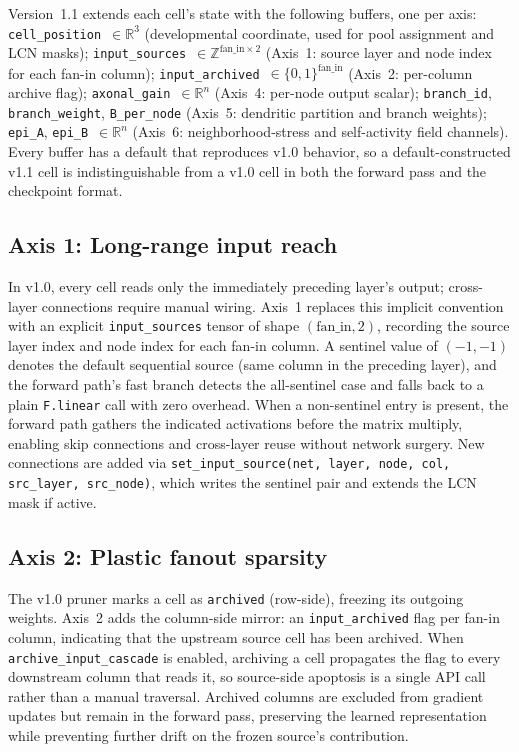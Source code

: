 \documentclass[11pt]{article}
\newcommand{\R}{\mathbb{R}}
\begin{document}
Version~1.1 extends each cell's state with the following buffers, one
per axis:
\texttt{cell\_position}~$\in \R^3$ (developmental coordinate, used for
  pool assignment and LCN masks);
\texttt{input\_sources}~$\in \mathbb{Z}^{\mathrm{fan\_in} \times 2}$
  (Axis~1: source layer and node index for each fan-in column);
\texttt{input\_archived}~$\in \{0,1\}^{\mathrm{fan\_in}}$
  (Axis~2: per-column archive flag);
\texttt{axonal\_gain}~$\in \R^{n}$ (Axis~4: per-node output scalar);
\texttt{branch\_id}, \texttt{branch\_weight}, \texttt{B\_per\_node}
  (Axis~5: dendritic partition and branch weights);
\texttt{epi\_A}, \texttt{epi\_B}~$\in \R^{n}$
  (Axis~6: neighborhood-stress and self-activity field channels).
Every buffer has a default that reproduces v1.0 behavior, so a
default-constructed v1.1 cell is indistinguishable from a v1.0 cell in
both the forward pass and the checkpoint format.

\subsection{Axis 1: Long-range input reach}
\label{sec:axis1}

In v1.0, every cell reads only the immediately preceding layer's output;
cross-layer connections require manual wiring.
Axis~1 replaces this implicit convention with an explicit
\texttt{input\_sources} tensor of shape $(\mathrm{fan\_in}, 2)$,
recording the source layer index and node index for each fan-in column.
A sentinel value of $(-1, -1)$ denotes the default sequential source
(same column in the preceding layer), and the forward path's fast branch
detects the all-sentinel case and falls back to a plain
\texttt{F.linear} call with zero overhead.
When a non-sentinel entry is present, the forward path gathers the
indicated activations before the matrix multiply, enabling skip
connections and cross-layer reuse without network surgery.
New connections are added via \texttt{set\_input\_source(net, layer,
node, col, src\_layer, src\_node)}, which writes the sentinel pair and
extends the LCN mask if active.

\subsection{Axis 2: Plastic fanout sparsity}
\label{sec:axis2}

The v1.0 pruner marks a cell as \texttt{archived} (row-side), freezing
its outgoing weights.
Axis~2 adds the column-side mirror: an \texttt{input\_archived} flag per
fan-in column, indicating that the upstream source cell has been
archived.
When \texttt{archive\_input\_cascade} is enabled, archiving a cell
propagates the flag to every downstream column that reads it, so
source-side apoptosis is a single API call rather than a manual
traversal.
Archived columns are excluded from gradient updates but remain in the
forward pass, preserving the learned representation while preventing
further drift on the frozen source's contribution.
\end{document}
